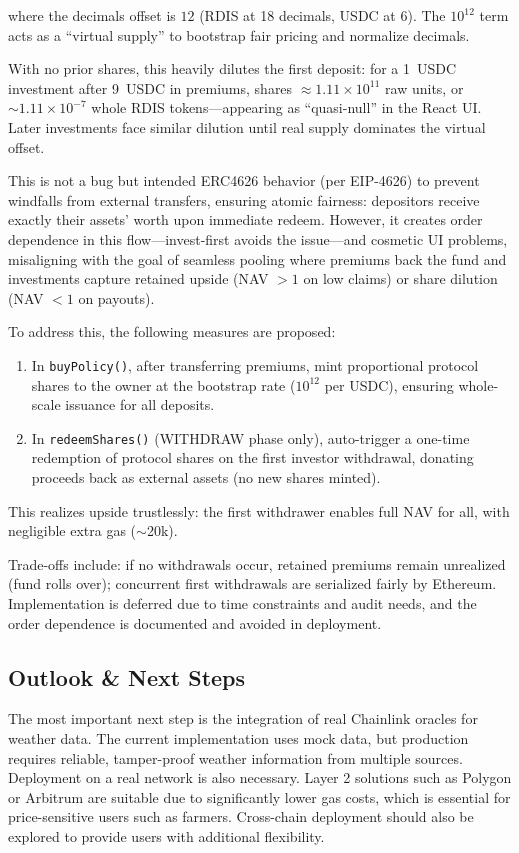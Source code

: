 \documentclass[11pt,a4paper]{article}
\begin{document}
        where the decimals offset is $12$ (RDIS at 18 decimals, USDC at 6).
        The $10^{12}$ term acts as a ``virtual supply'' to bootstrap fair pricing and normalize decimals.

        With no prior shares, this heavily dilutes the first deposit: for a 1~USDC investment after 9~USDC in premiums, shares $\approx 1.11 \times 10^{11}$ raw units, or $\sim 1.11 \times 10^{-7}$ whole RDIS tokens---appearing as ``quasi-null'' in the React UI.
        Later investments face similar dilution until real supply dominates the virtual offset.

        This is not a bug but intended ERC4626 behavior (per EIP-4626) to prevent windfalls from external transfers, ensuring atomic fairness: depositors receive exactly their assets' worth upon immediate redeem.
        However, it creates order dependence in this flow---invest-first avoids the issue---and cosmetic UI problems, misaligning with the goal of seamless pooling where premiums back the fund and investments capture retained upside (NAV $> 1$ on low claims) or share dilution (NAV $< 1$ on payouts).

        To address this, the following measures are proposed:
        \begin{enumerate}
        \item In \texttt{buyPolicy()}, after transferring premiums, mint proportional protocol shares to the owner at the bootstrap rate ($10^{12}$ per USDC), ensuring whole-scale issuance for all deposits.
        \item In \texttt{redeemShares()} (WITHDRAW phase only), auto-trigger a one-time redemption of protocol shares on the first investor withdrawal, donating proceeds back as external assets (no new shares minted).
        \end{enumerate}
        This realizes upside trustlessly: the first withdrawer enables full NAV for all, with negligible extra gas ($\sim$20k).

        Trade-offs include: if no withdrawals occur, retained premiums remain unrealized (fund rolls over); concurrent first withdrawals are serialized fairly by Ethereum.
        Implementation is deferred due to time constraints and audit needs, and the order dependence is documented and avoided in deployment.


		\subsection{Outlook \& Next Steps}\label{subsec:outlook}
		The most important next step is the integration of real Chainlink oracles for weather data.
		The current implementation uses mock data, but production requires reliable, tamper-proof weather information from multiple sources. 
		Deployment on a real network is also necessary. 
		Layer 2 solutions such as Polygon or Arbitrum are suitable due to significantly lower gas costs, which is essential for price-sensitive users such as farmers. 
		Cross-chain deployment should also be explored to provide users with additional flexibility. 
\end{document}
